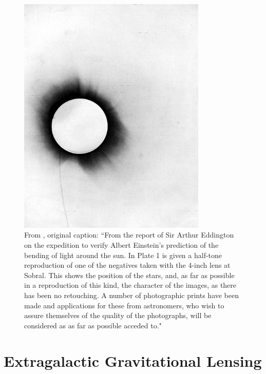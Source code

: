 \begin{figure}
\centering
\includegraphics[width=0.8\textwidth]{Intro/1919_eclipse_negative.jpg}
\caption[Photometric plates from the 1919 solar eclipse]{From \citet{Dyson:1920zl}, original caption: ``From the report of Sir Arthur Eddington on the expedition to verify Albert Einstein's prediction of the bending of light around the sun. In Plate 1 is given a half-tone reproduction of one of the negatives taken with the 4-inch lens at Sobral. This shows the position of the stars, and, as far as possible in a reproduction of this kind, the character of the images, as there has been no retouching. A number of photographic prints have been made and applications for these from astronomers, who wish to assure themselves of the quality of the photographs, will be considered as as far as possible acceded to."}
\label{intro:fig:eclipse}
\end{figure}


\section{Extragalactic Gravitational Lensing}

